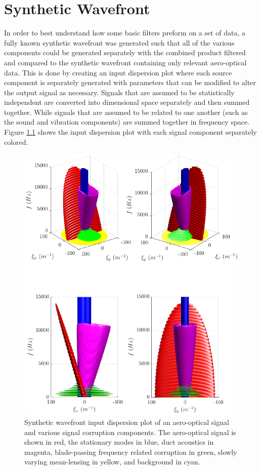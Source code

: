 
\chapter{Synthetic Wavefront}
\label{chap:05_synthetic}
In order to best understand how some basic filters preform on a set of data, a fully known synthetic wavefront was generated such that all of the various components could be generated separately with the combined product filtered and compared to the synthetic wavefront containing only relevant aero-optical data.
This is done by creating an input dispersion plot where each source component is separately generated with parameters that can be modified to alter the output signal as necessary.
Signals that are assumed to be statistically independent are converted into dimensional space separately and then summed together.
While signals that are assumed to be related to one another (such as the sound and vibration components) are summed together in frequency space.
Figure \ref{fig:05_synthetic_dispersion_input} shows the input dispersion plot with each signal component separately colored.
\begin{figure}
 \centering
 \includegraphics{../matlab/05_synthetic_wavefront/synthetic_wavefront.eps}
 \caption{Synthetic wavefront input dispersion plot of an aero-optical signal and various signal corruption components.  The aero-optical signal is shown in red, the stationary modes in blue, duct acoustics in magenta, blade-passing frequency related corruption in green, slowly varying mean-lensing in yellow, and background in cyan.}
 \label{fig:05_synthetic_dispersion_input}
\end{figure}
